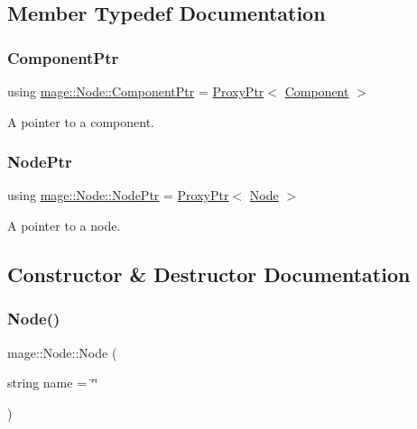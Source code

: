 \subsection{Member Typedef Documentation}
\hypertarget{classmage_1_1_node_a46b7e1f4f5b98bfa78ed96a80797a4ba}{}\label{classmage_1_1_node_a46b7e1f4f5b98bfa78ed96a80797a4ba} 
\subsubsection{\texorpdfstring{Component\+Ptr}{ComponentPtr}}
{\footnotesize\ttfamily using \hyperlink{classmage_1_1_node_a46b7e1f4f5b98bfa78ed96a80797a4ba}{mage\+::\+Node\+::\+Component\+Ptr} =  \hyperlink{classmage_1_1_proxy_ptr}{Proxy\+Ptr}$<$ \hyperlink{classmage_1_1_component}{Component} $>$}

A pointer to a component. \hypertarget{classmage_1_1_node_ac575dc006e0ae1134277ade977dc06b6}{}\label{classmage_1_1_node_ac575dc006e0ae1134277ade977dc06b6} 
\subsubsection{\texorpdfstring{Node\+Ptr}{NodePtr}}
{\footnotesize\ttfamily using \hyperlink{classmage_1_1_node_ac575dc006e0ae1134277ade977dc06b6}{mage\+::\+Node\+::\+Node\+Ptr} =  \hyperlink{classmage_1_1_proxy_ptr}{Proxy\+Ptr}$<$ \hyperlink{classmage_1_1_node}{Node} $>$}

A pointer to a node. 

\subsection{Constructor \& Destructor Documentation}
\hypertarget{classmage_1_1_node_a6638b75608b2b340743a0a639230492d}{}\label{classmage_1_1_node_a6638b75608b2b340743a0a639230492d} 
\subsubsection{\texorpdfstring{Node()}{Node()}\hspace{0.1cm}{\footnotesize\ttfamily [1/3]}}
{\footnotesize\ttfamily mage\+::\+Node\+::\+Node (\begin{DoxyParamCaption}\item[{string}]{name = {\ttfamily \char`\"{}\char`\"{}} }\end{DoxyParamCaption})\hspace{0.3cm}{\ttfamily [explicit]}}

